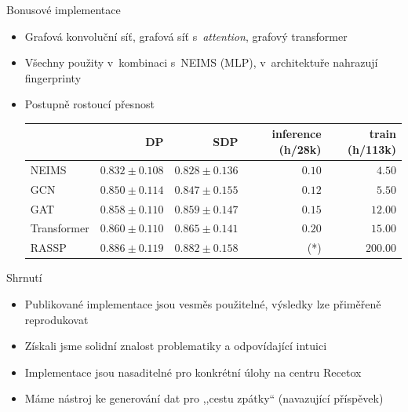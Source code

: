 \documentclass[aspectratio=169]{beamer}
\begin{document}
\begin{frame}
{Bonusové implementace}
\begin{itemize}
\item Grafová konvoluční síť, grafová síť s~\emph{attention}, grafový transformer
\item Všechny použity v~kombinaci s~NEIMS (MLP), v~architektuře nahrazují fingerprinty
\item Postupně rostoucí přesnost 

\bigskip
\begin{tabular}{|l|r|r|r|r|}
\hline
& DP & SDP & inference (h/28k) & train (h/113k) \\
\hline
NEIMS &
$0.832 \pm 0.108 $&
$0.828 \pm 0.136 $&
$0.10 $&
$4.50 $\\
GCN &
$0.850 \pm 0.114 $&
$0.847 \pm 0.155 $&
$0.12 $&
$5.50 $\\
GAT &
$0.858 \pm 0.110 $&
$0.859 \pm 0.147 $&
$0.15 $&
$12.00$ \\
Transformer &
$0.860 \pm 0.110 $&
$0.865 \pm 0.141 $&
$0.20 $&
$15.00$ \\
RASSP &
$0.886 \pm 0.119 $&
$0.882 \pm 0.158 $&
\color{gray}{$120$} (*)&
$200.00 $\\
\hline
\end{tabular}

\end{itemize}
\end{frame}

\begin{frame}
{Shrnutí}
\begin{itemize}
\item Publikované implementace jsou vesměs použitelné, výsledky lze přiměřeně reprodukovat
\item Získali jsme solidní znalost problematiky a odpovídající intuici
\item Implementace jsou nasaditelné pro konkrétní úlohy na centru Recetox
\item Máme nástroj ke generování dat pro ,,cestu zpátky`` (navazující příspěvek)
\end{itemize}
\end{frame}
\end{document}
